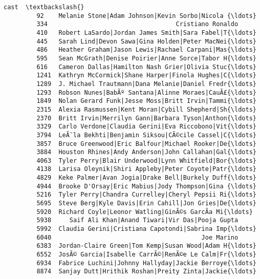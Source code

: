 \documentclass[11pt]{article}
\begin{document}
\begin{Verbatim}[commandchars=\\\{\}]
                                                            cast  \textbackslash{}
         92    Melanie Stone|Adam Johnson|Kevin Sorbo|Nicola {\ldots}   
         334                                   Cristiano Ronaldo   
         410   Robert LaSardo|Jordan James Smith|Sara Fabel|T{\ldots}   
         445   Sarah Lind|Devon Sawa|Gina Holden|Peter MacNei{\ldots}   
         486   Heather Graham|Jason Lewis|Rachael Carpani|Mas{\ldots}   
         595   Sean McGrath|Denise Poirier|Anne Sorce|Tabor H{\ldots}   
         616   Cameron Dallas|Hamilton Nash Grier|Olivia Stuc{\ldots}   
         1241  Kathryn McCormick|Shane Harper|Finola Hughes|C{\ldots}   
         1289  J. Michael Trautmann|Dana Melanie|Daniel Fredr{\ldots}   
         1293  Robson Nunes|BabÃº Santana|Alinne Moraes|CauÃ£{\ldots}   
         1849  Nolan Gerard Funk|Jesse Moss|Britt Irvin|Tammi{\ldots}   
         2315  Alexia Rasmussen|Kent Moran|Cybill Shepherd|Sh{\ldots}   
         2370  Britt Irvin|Merrilyn Gann|Barbara Tyson|Anthon{\ldots}   
         3329  Carlo Verdone|Claudia Gerini|Eva Riccobono|Vit{\ldots}   
         3794  LeÃ¯la Bekhti|Benjamin Siksou|CÃ©cile Cassel|C{\ldots}   
         3857  Bruce Greenwood|Eric Balfour|Michael Rooker|De{\ldots}   
         3884  Houston Rhines|Andy Anderson|John Callahan|Gal{\ldots}   
         4063  Tyler Perry|Blair Underwood|Lynn Whitfield|Bor{\ldots}   
         4138  Larisa Oleynik|Shiri Appleby|Peter Coyote|Patr{\ldots}   
         4829  Keke Palmer|Avan Jogia|Drake Bell|Burkely Duff{\ldots}   
         4944  Brooke D'Orsay|Eric Mabius|Jody Thompson|Gina {\ldots}   
         5216  Tyler Perry|Chandra Currelley|Cheryl Pepsii Ri{\ldots}   
         5695  Steve Berg|Kyle Davis|Erin Cahill|Jon Gries|De{\ldots}   
         5920  Richard Coyle|Leonor Watling|GinÃ©s GarcÃ­a Mi{\ldots}   
         5938     Saif Ali Khan|Anand Tiwari|Vir Das|Pooja Gupta   
         5992  Claudia Gerini|Cristiana Capotondi|Sabrina Imp{\ldots}   
         6040                                         Joe Marino   
         6383  Jordan-Claire Green|Tom Kemp|Susan Wood|Adam H{\ldots}   
         6552  JosÃ© Garcia|Isabelle CarrÃ©|RenÃ©e Le Calm|Fr{\ldots}   
         6934  Fabrice Luchini|Johnny Hallyday|Jackie Berroye{\ldots}   
         8874  Sanjay Dutt|Hrithik Roshan|Preity Zinta|Jackie{\ldots}   
         

\end{Verbatim}
\end{document}
